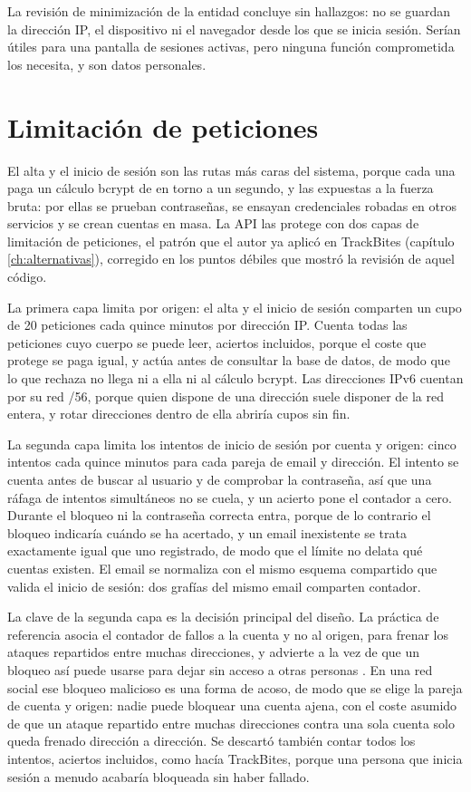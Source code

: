 La revisión de minimización de la entidad concluye sin hallazgos: no se guardan la dirección IP, el dispositivo ni el navegador desde los que se inicia sesión.
Serían útiles para una pantalla de sesiones activas, pero ninguna función comprometida los necesita, y son datos personales.

\section{Limitación de peticiones}
\label{sec:diseno-limitacion}

El alta y el inicio de sesión son las rutas más caras del sistema, porque cada una paga un cálculo bcrypt de en torno a un segundo, y las expuestas a la fuerza bruta: por ellas se prueban contraseñas, se ensayan credenciales robadas en otros servicios y se crean cuentas en masa.
La \ac{API} las protege con dos capas de limitación de peticiones, el patrón que el autor ya aplicó en TrackBites (capítulo \ref{ch:alternativas}), corregido en los puntos débiles que mostró la revisión de aquel código.

La primera capa limita por origen: el alta y el inicio de sesión comparten un cupo de 20 peticiones cada quince minutos por dirección \ac{IP}.
Cuenta todas las peticiones cuyo cuerpo se puede leer, aciertos incluidos, porque el coste que protege se paga igual, y actúa antes de consultar la base de datos, de modo que lo que rechaza no llega ni a ella ni al cálculo bcrypt.
Las direcciones IPv6 cuentan por su red /56, porque quien dispone de una dirección suele disponer de la red entera, y rotar direcciones dentro de ella abriría cupos sin fin.

La segunda capa limita los intentos de inicio de sesión por cuenta y origen: cinco intentos cada quince minutos para cada pareja de email y dirección.
El intento se cuenta antes de buscar al usuario y de comprobar la contraseña, así que una ráfaga de intentos simultáneos no se cuela, y un acierto pone el contador a cero.
Durante el bloqueo ni la contraseña correcta entra, porque de lo contrario el bloqueo indicaría cuándo se ha acertado, y un email inexistente se trata exactamente igual que uno registrado, de modo que el límite no delata qué cuentas existen.
El email se normaliza con el mismo esquema compartido que valida el inicio de sesión: dos grafías del mismo email comparten contador.

La clave de la segunda capa es la decisión principal del diseño.
La práctica de referencia asocia el contador de fallos a la cuenta y no al origen, para frenar los ataques repartidos entre muchas direcciones, y advierte a la vez de que un bloqueo así puede usarse para dejar sin acceso a otras personas \parencite{owasp-authentication}.
En una red social ese bloqueo malicioso es una forma de acoso, de modo que se elige la pareja de cuenta y origen: nadie puede bloquear una cuenta ajena, con el coste asumido de que un ataque repartido entre muchas direcciones contra una sola cuenta solo queda frenado dirección a dirección.
Se descartó también contar todos los intentos, aciertos incluidos, como hacía TrackBites, porque una persona que inicia sesión a menudo acabaría bloqueada sin haber fallado.

